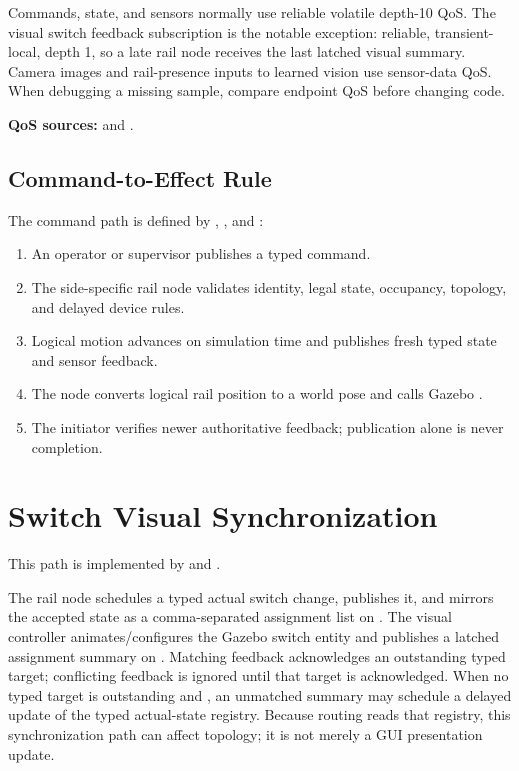Commands, state, and sensors normally use reliable volatile depth-10 QoS. The
visual switch feedback subscription is the notable exception: reliable,
transient-local, depth 1, so a late rail node receives the last latched visual
summary. Camera images and rail-presence inputs to learned vision use sensor-data
QoS. When debugging a missing sample, compare endpoint QoS before changing code.

\noindent\textbf{QoS sources:}
 and
.

\subsection{Command-to-Effect Rule}

The command path is defined by
,
, and
:

\begin{enumerate}
  \item An operator or supervisor publishes a typed command.
  \item The side-specific rail node validates identity, legal state, occupancy,
        topology, and delayed device rules.
  \item Logical motion advances on simulation time and publishes fresh typed
        state and sensor feedback.
  \item The node converts logical rail position to a world pose and calls
        Gazebo .
  \item The initiator verifies newer authoritative feedback; publication alone
        is never completion.
\end{enumerate}

\section{Switch Visual Synchronization}

This path is implemented by
 and
.

The rail node schedules a typed actual switch change, publishes it, and mirrors
the accepted state as a comma-separated 
 assignment list on
. The visual controller animates/configures
the Gazebo switch entity and publishes a latched assignment summary on
. Matching feedback acknowledges an
outstanding typed target; conflicting feedback is ignored until that target is
acknowledged. When no typed target is outstanding and
, an unmatched summary may schedule a
delayed update of the typed actual-state registry. Because routing reads that
registry, this synchronization path can affect topology; it is not merely a GUI
presentation update.

